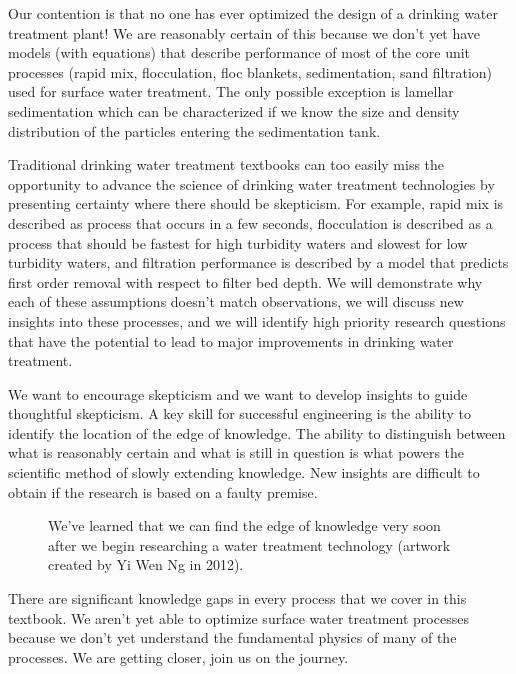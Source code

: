 \documentclass[letterpaper,10pt,english]{sphinxmanual}
\let\sphinxpxdimen\pdfpxdimen\else\newdimen\sphinxpxdimen
\begin{document}
Our contention is that no one has ever optimized the design of a drinking water treatment plant! We are reasonably certain of this because we don’t yet have models (with equations) that describe performance of most of the core unit processes (rapid mix, flocculation, floc blankets, sedimentation, sand filtration) used for surface water treatment. The only possible exception is lamellar sedimentation which can be characterized if we know the size and density distribution of the particles entering the sedimentation tank.

Traditional drinking water treatment textbooks can too easily miss the opportunity to advance the science of drinking water treatment technologies by presenting certainty where there should be skepticism. For example, rapid mix is described as process that occurs in a few seconds, flocculation is described as a process that should be fastest for high turbidity waters and slowest for low turbidity waters, and filtration performance is described by a model that predicts first order removal with respect to filter bed depth. We will demonstrate why each of these assumptions doesn’t match observations, we will discuss new insights into these processes, and we will identify high priority research questions that have the potential to lead to major improvements in drinking water treatment.

We want to encourage skepticism and we want to develop insights to guide thoughtful skepticism. A key skill for successful engineering is the ability to identify the location of the edge of knowledge. The ability to distinguish between what is reasonably certain and what is still in question is what powers the scientific method of slowly extending knowledge. New insights are difficult to obtain if the research  is based on a faulty premise.

\begin{figure}[htbp]
\centering
\capstart

\noindent\sphinxincludegraphics[width=500\sphinxpxdimen]{{Short_walk_to_the_edge}.jpg}
\caption{We’ve learned that we can find the edge of knowledge very soon after we begin researching a water treatment technology (artwork created by Yi Wen Ng in 2012).}\label{\detokenize{Introduction/Introduction:id12}}\label{\detokenize{Introduction/Introduction:figure-short-walk}}\end{figure}

There are significant knowledge gaps in every process that we cover in this textbook. We aren’t yet able to optimize surface water treatment processes because we don’t yet understand the fundamental physics of many of the processes. We are getting closer, join us on the journey.
\end{document}
